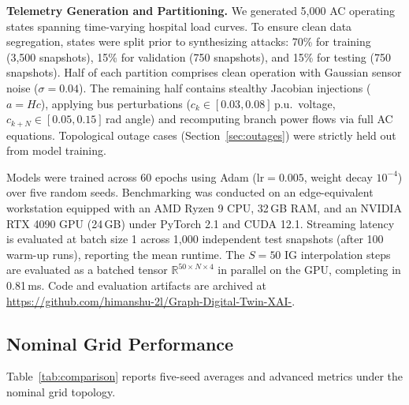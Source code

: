 \documentclass[runningheads]{llncs}
\begin{document}
\textbf{Telemetry Generation and Partitioning.}
We generated 5{,}000 AC operating states spanning time-varying hospital load curves.
To ensure clean data segregation, states were split prior to synthesizing attacks: 70\% for training (3{,}500 snapshots), 15\% for validation (750 snapshots), and 15\% for testing (750 snapshots).
Half of each partition comprises clean operation with Gaussian sensor noise ($\sigma = 0.04$).
The remaining half contains stealthy Jacobian injections ($a = Hc$), applying bus perturbations ($c_{k} \in [0.03, 0.08]$\,p.u.\ voltage, $c_{k+N} \in [0.05, 0.15]$\,rad angle) and recomputing branch power flows via full AC equations.
Topological outage cases (Section~\ref{sec:outages}) were strictly held out from model training.

Models were trained across 60 epochs using Adam ($\mathrm{lr} = 0.005$, weight decay $10^{-4}$) over five random seeds.
Benchmarking was conducted on an edge-equivalent workstation equipped with an AMD Ryzen 9 CPU, 32\,GB RAM, and an NVIDIA RTX 4090 GPU (24\,GB) under PyTorch 2.1 and CUDA 12.1.
Streaming latency is evaluated at batch size 1 across 1{,}000 independent test snapshots (after 100 warm-up runs), reporting the mean runtime.
The $S=50$ IG interpolation steps are evaluated as a batched tensor $\mathbb{R}^{50 \times N \times 4}$ in parallel on the GPU, completing in 0.81\,ms.
Code and evaluation artifacts are archived at \url{https://github.com/himanshu-2l/Graph-Digital-Twin-XAI-}.

\subsection{Nominal Grid Performance}

Table~\ref{tab:comparison} reports five-seed averages and advanced metrics under the nominal grid topology.

\begin{table}[t]
\caption{Comprehensive performance benchmarking under nominal grid layout (5-seed average $\pm$ std).}
\label{tab:comparison}
\centering
{}
\end{table}
\end{document}
